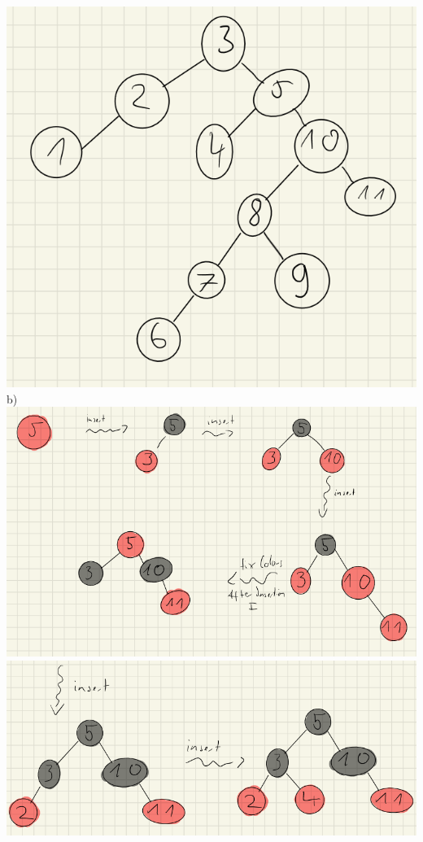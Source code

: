\documentclass{article}
\begin{document}
\includegraphics[scale=0.5]{ h1_a4 }  
\newpage 
\noindent b) \\
\includegraphics[scale=0.5]{ h1_a5 } \\
\bigskip
\includegraphics[scale=0.5]{ h1_a6 } \\
\end{document}
